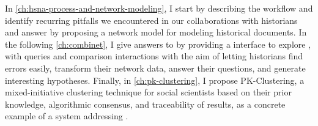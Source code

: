 In \autoref{ch:hsna-process-and-network-modeling}, I start by describing the \hsna workflow and identify recurring pitfalls we encountered in our collaborations with historians and answer \qone by proposing a network model for modeling historical documents.
In the following \autoref{ch:combinet}, I give answers to \qtwo by providing a \va interface to explore \modelplural, with queries and comparison interactions with the aim of letting historians find errors easily, transform their network data, answer their questions, and generate interesting hypotheses.
Finally, in \autoref{ch:pk-clustering}, I propose PK-Clustering, a mixed-initiative clustering technique for social scientists based on their prior knowledge, algorithmic consensus, and traceability of results, as a concrete example of a system addressing \qthree.




